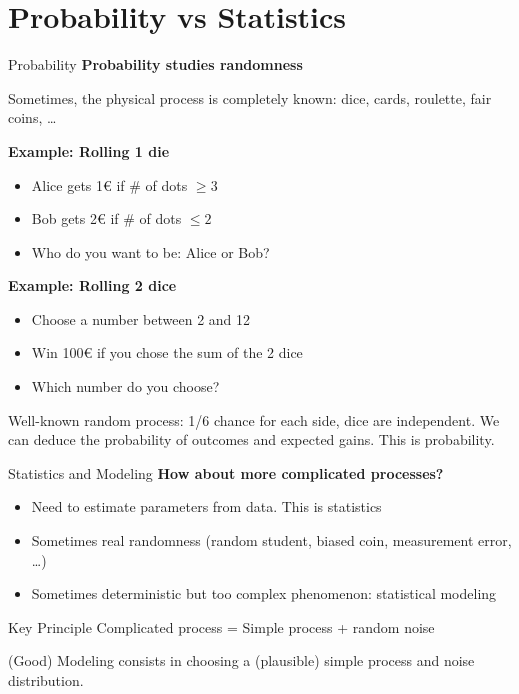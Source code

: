 \documentclass[aspectratio=169]{beamer}
\begin{document}
\section{Probability vs Statistics}

\begin{frame}{Probability}
\textbf{Probability studies randomness}

Sometimes, the physical process is completely known: dice, cards, roulette, fair coins, \dots

\vspace{0.2cm}

\textbf{Example: Rolling 1 die}
\begin{itemize}
    \item Alice gets 1\euro{} if \# of dots $\geq 3$
    \item Bob gets 2\euro{} if \# of dots $\leq 2$
    \item Who do you want to be: Alice or Bob?
\end{itemize}

\textbf{Example: Rolling 2 dice}
\begin{itemize}
    \item Choose a number between 2 and 12
    \item Win 100\euro{} if you chose the sum of the 2 dice
    \item Which number do you choose?
\end{itemize}

{\small Well-known random process: 1/6 chance for each side, dice are independent. We can deduce the probability of outcomes and expected gains. This is probability.\par}
\end{frame}

\begin{frame}{Statistics and Modeling}
\textbf{How about more complicated processes?}
\begin{itemize}
    \item Need to estimate parameters from data. This is statistics
    \item Sometimes real randomness (random student, biased coin, measurement error, \dots)
    \item Sometimes deterministic but too complex phenomenon: statistical modeling
\end{itemize}

\vspace{0.5cm}

\begin{block}{Key Principle}
Complicated process = Simple process + random noise
\end{block}

\vspace{0.3cm}

(Good) Modeling consists in choosing a (plausible) simple process and noise distribution.
\end{frame}
\end{document}
